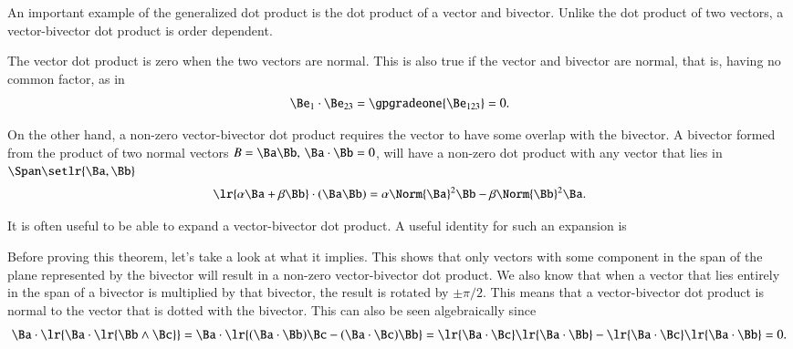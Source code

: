 %
%

An important example of the generalized dot product is the dot product of a vector and bivector.
Unlike the dot product of two vectors, a vector-bivector dot product is order dependent.

The vector dot product is zero when the two vectors are normal.
This is also true if the vector and bivector are normal, that is, having no common factor, as in
\begin{equation}\label{eqn:generalizedDot_vectorBivector:661}
\Be_1 \cdot \Be_{23} = \gpgradeone{ \Be_{123} } = 0.
\end{equation}

On the other hand, a non-zero vector-bivector dot product requires the vector to have some overlap with the bivector.
A bivector formed from the product of two normal vectors \( B = \Ba \Bb, \, \Ba \cdot \Bb = 0 \), will have a non-zero dot product with any vector that lies in \( \Span \setlr{ \Ba, \Bb} \)
\begin{dmath}\label{eqn:generalizedDot_vectorBivector:682}
\lr{ \alpha \Ba + \beta \Bb } \cdot (\Ba\Bb)
=
\alpha \Norm{\Ba}^2 \Bb - \beta \Norm{\Bb}^2 \Ba.
\end{dmath}

It is often useful to be able to expand a vector-bivector dot product.
A useful identity for such an expansion is


Before proving this theorem, let's take a look at what it implies.  
This shows that only vectors with some component in the span of the plane represented by the bivector will result in a non-zero vector-bivector dot product.
We also know that when a vector that lies entirely in the span of a bivector is multiplied by that bivector, the result is rotated by \( \pm \pi/2 \).
This means that a vector-bivector dot product is normal to the vector that is dotted with the bivector.
This can also be seen algebraically since
\begin{dmath}\label{eqn:generalizedDot_vectorBivector:1120}
\Ba \cdot \lr{ \Ba \cdot \lr{ \Bb \wedge \Bc }}
=
\Ba \cdot \lr{ ( \Ba \cdot \Bb ) \Bc -( \Ba \cdot \Bc ) \Bb }
=
\lr{ \Ba \cdot \Bc } \lr{ \Ba \cdot \Bb } - \lr{ \Ba \cdot \Bc } \lr{ \Ba \cdot \Bb }
= 0.
\end{dmath}

